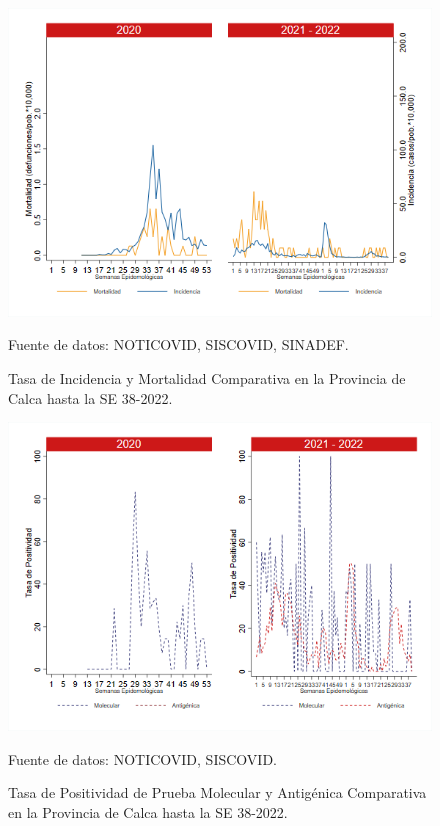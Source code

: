 \documentclass[12pt,a4paper,openany]{book}
\begin{document}
	
	\begin{figure}[h]
		\caption{Tasa de Incidencia y Mortalidad Comparativa en la Provincia de Calca hasta la SE 38-2022.}\label{fig:inc_mort_calca}
		\begin{center}
			\includegraphics[width=0.85\linewidth]{../figuras/incidencia_mortalidad_20_21_3.png}
		\end{center}
		{\footnotesize {Fuente de datos: NOTICOVID, SISCOVID, SINADEF.}}
	\end{figure}
	
	\begin{figure}[h]
		\caption{Tasa de Positividad de Prueba Molecular y Antigénica Comparativa en la Provincia de Calca hasta la SE 38-2022.}\label{fig:positividad_calca}
		\begin{center}
			\includegraphics[width=0.7\linewidth]{../figuras/positividad_20_21_3.png}
		\end{center}
		{\footnotesize {Fuente de datos: NOTICOVID, SISCOVID.}}
	\end{figure}
	
\end{document}
